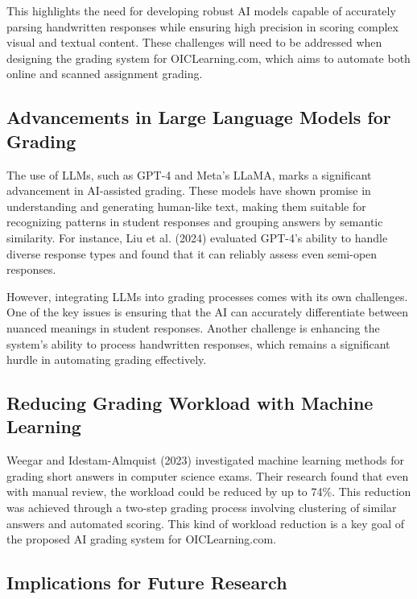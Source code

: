 \documentclass[ms,twoside,print]{nuthesis}
\begin{document}
This highlights the need for developing robust AI models capable of accurately parsing handwritten 
responses while ensuring high precision in scoring complex visual and textual content. 
These challenges will need to be addressed when designing the grading system for OICLearning.com, 
which aims to automate both online and scanned assignment grading.

\subsection{Advancements in Large Language Models for Grading}

The use of LLMs, such as GPT-4 and Meta's LLaMA, marks a significant advancement in AI-assisted 
grading. These models have shown promise in understanding and generating human-like text, making 
them suitable for recognizing patterns in student responses and grouping answers by semantic similarity. 
For instance, Liu et al. (2024) \cite{Liu2024} evaluated GPT-4’s ability to handle diverse response 
types and found that it can reliably assess even semi-open responses.

However, integrating LLMs into grading processes comes with its own challenges. One of the key 
issues is ensuring that the AI can accurately differentiate between nuanced meanings in student 
responses. Another challenge is enhancing the system’s ability to process handwritten responses, 
which remains a significant hurdle in automating grading effectively.

\subsection{Reducing Grading Workload with Machine Learning}

Weegar and Idestam-Almquist (2023) \cite{RebeckaWeegar2024} investigated machine learning methods for 
grading short answers in computer science exams. Their research found that even with manual 
review, the workload could be reduced by up to 74\%. This reduction was achieved through a 
two-step grading process involving clustering of similar answers and automated scoring. 
This kind of workload reduction is a key goal of the proposed AI grading system for OICLearning.com.

\subsection{Implications for Future Research}
\end{document}
